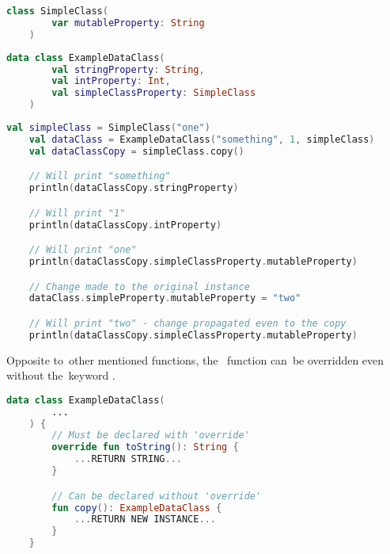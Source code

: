 \example
\begin{lstlisting}[language=Kotlin, title={A class with mutable property}]
    class SimpleClass(
        var mutableProperty: String
    )
\end{lstlisting}
\newpage
\begin{lstlisting}[language=Kotlin, title={Data class}]
    data class ExampleDataClass(
        val stringProperty: String,
        val intProperty: Int,
        val simpleClassProperty: SimpleClass
    )
\end{lstlisting}
\begin{lstlisting}[language=Kotlin, title={\itq{copy} behavior}]
    val simpleClass = SimpleClass("one")
    val dataClass = ExampleDataClass("something", 1, simpleClass)
    val dataClassCopy = simpleClass.copy()

    // Will print "something"
    println(dataClassCopy.stringProperty)

    // Will print "1"
    println(dataClassCopy.intProperty)

    // Will print "one"
    println(dataClassCopy.simpleClassProperty.mutableProperty)

    // Change made to the original instance
    dataClass.simpleProperty.mutableProperty = "two"

    // Will print "two" - change propagated even to the copy
    println(dataClassCopy.simpleClassProperty.mutableProperty)
\end{lstlisting}

\warning Opposite to~other mentioned functions, \mbox{the } function can~be overridden even without the~keyword \mbox{.}

\begin{lstlisting}[language=Kotlin]
    data class ExampleDataClass(
        ...
    ) {
        // Must be declared with 'override'
        override fun toString(): String {
            ...RETURN STRING...
        }

        // Can be declared without 'override'
        fun copy(): ExampleDataClass {
            ...RETURN NEW INSTANCE...
        }
    }
\end{lstlisting}
\newpage
